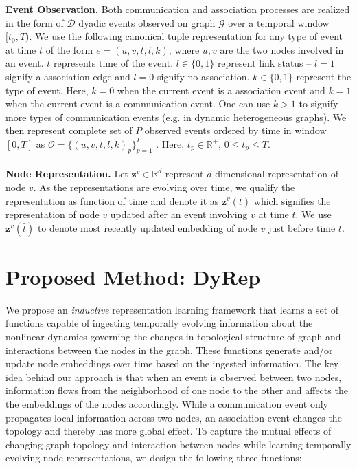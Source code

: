 \documentclass[11pt]{article}
\begin{document}
{\bf Event Observation.} Both communication and association processes are realized in the form of $\mathcal{D}$ dyadic events observed on graph $\mathcal{G}$ over a temporal window $[t_0,T)$. We use the following canonical tuple representation for any type of event at time $t$ of the form $e = (u, v, t, l, k)$,
where $u, v$ are the two nodes involved in an event. $t$ represents time of the event. $l \in \{0,1\}$ represent link status -- $l=1$ signify a association edge and $l=0$ signify no association. $k \in \{0,1\}$ represent the type of event. Here, $k=0$ when the current event is a association event and $k=1$ when the current event is a communication event. One can use $k>1$ to signify more types of communication events (e.g. in dynamic heterogeneous graphs). We then represent complete set of $P$ observed events ordered by time in window $[0,T]$ as $\mathcal{O} = \{(u, v, t, l, k)_p\}_{p=1}^P$ . Here, $t_p \in \mathbb{R}^+$, $0 \le t_p \le T$.\\\\
{\bf Node Representation.} Let $\mathbf{z}^v \in \mathbb{R}^d$ represent $d$-dimensional representation of node $v$. As the representations are evolving over time, we qualify the representation as function of time and  denote it as $\mathbf{z}^v(t)$ which signifies the representation of node $v$ updated after an event involving $v$ at time $t$. We use $\mathbf{z}^v(\bar{t})$ to denote most recently updated  embedding of node $v$ just before time $t$. 

\section{Proposed Method: DyRep}
\vspace{-2mm}
\label{model}

We propose an \textit{inductive} representation learning framework that learns a set of functions capable of ingesting
temporally evolving information about the nonlinear dynamics governing the changes in topological structure of graph and interactions between the nodes in the graph. These functions generate and/or update node embeddings over time based on the ingested information. The key idea behind our approach is that  when an event is observed between two nodes, information flows from the neighborhood of one node to the other and affects the the embeddings of the nodes accordingly. While a communication event only propagates local information across two nodes, an association event changes the topology and thereby has more global effect. To capture the mutual effects of changing graph topology and interaction between nodes while learning temporally evolving node representations, we design the following three functions:
\end{document}
